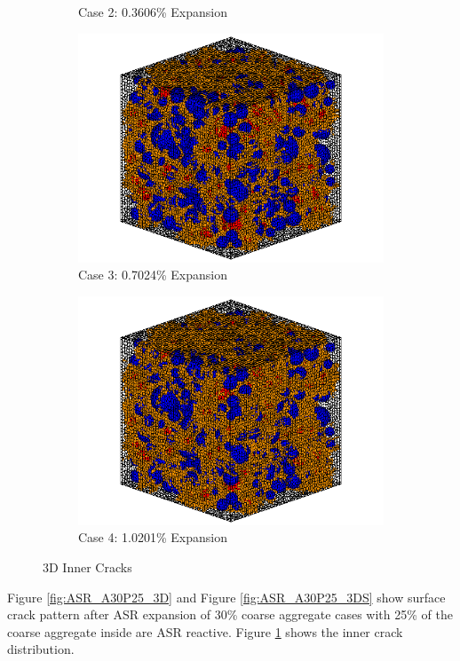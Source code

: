 \begin{figure}[!h]
\begin{subfigure}{.5\textwidth}
    \caption{Case 2: 0.3606\% Expansion}
    \end{subfigure}%
    \begin{subfigure}{.5\textwidth}
      \centering
      \includegraphics[width=.8\linewidth]{Files/exp_3D/ASR/A30P25_3_c.png}
    \caption{Case 3: 0.7024\% Expansion}
    \end{subfigure}
    \begin{subfigure}{.5\textwidth}
      \centering
      \includegraphics[width=.8\linewidth]{Files/exp_3D/ASR/A30P25_4_c.png}
    \caption{Case 4: 1.0201\% Expansion}
    \end{subfigure}%


  \caption{3D Inner Cracks}
  \label{fig:ASR_A30P25_crack}
\end{figure}

Figure \ref{fig:ASR_A30P25_3D} and Figure \ref{fig:ASR_A30P25_3DS} show surface crack pattern after ASR expansion of 30\% coarse aggregate cases with 25\% of the coarse aggregate inside are ASR reactive. Figure \ref{fig:ASR_A30P25_crack} shows the inner crack distribution.

